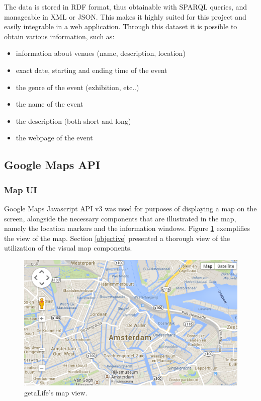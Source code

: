 \documentclass[hidelinks,a4paper]{article}
\begin{document}
The data is stored in RDF format, thus obtainable with SPARQL queries, and manageable in XML or JSON. This makes it highly suited for this project and easily integrable in a web application. Through this dataset it is possible to obtain various information, such as:
\begin{itemize}

  \item information about venues (name, description, location)
  \item exact date, starting and ending time of the event
  \item the genre of the event (exhibition, etc..)
  \item the name of the event
  \item the description (both short and long)
  \item the webpage of the event
\end{itemize}

\subsection{Google Maps API} \label{gmaps}

\subsubsection{Map UI}
Google Maps Javascript API v3 \cite{gmapsv3} was used for purposes of displaying a map on the screen, alongside the necessary components that are illustrated in the map, namely the location markers and the information windows. Figure \ref{fig:google_map} exemplifies the view of the map. Section \ref{objective} presented a thorough view of the utilization of the visual map components.

\begin{figure}[h!]
  \centering
    \includegraphics[scale=0.7]{images/google_map.png}    
    \caption{getaLife's map view.}
    \label{fig:google_map}
\end{figure}
\end{document}
